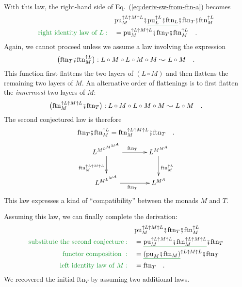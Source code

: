 With this law, the right-hand side of Eq.~(\ref{eq:deriv-sw-from-ftn-a})
becomes
\begin{align*}
 & \text{pu}_{M}^{\uparrow L\uparrow M\uparrow L}\bef\gunderline{\text{pu}_{L}^{\uparrow L}\bef\text{ftn}_{L}}\bef\text{ftn}_{T}\bef\text{ftn}_{M}^{\uparrow L}\\
{\color{greenunder}\text{right identity law of }L:}\quad & =\text{pu}_{M}^{\uparrow L\uparrow M\uparrow L}\bef\text{ftn}_{T}\bef\text{ftn}_{M}^{\uparrow L}\quad.
\end{align*}
Again, we cannot proceed unless we assume a law involving the expression
\[
\big(\text{ftn}_{T}\bef\text{ftn}_{M}^{\uparrow L}\big):L\circ M\circ L\circ M\circ M\leadsto L\circ M\quad.
\]
This function first flattens the two layers of $\left(L\circ M\right)$
and then flattens the remaining two layers of $M$. An alternative
order of flattenings is to first flatten the \emph{innermost} two
layers of $M$:
\[
\big(\text{ftn}_{M}^{\uparrow L\uparrow M\uparrow L}\bef\text{ftn}_{T}\big):L\circ M\circ L\circ M\circ M\leadsto L\circ M\quad.
\]
The second conjectured law is therefore
\[
\text{ftn}_{T}\bef\text{ftn}_{M}^{\uparrow L}=\text{ftn}_{M}^{\uparrow L\uparrow M\uparrow L}\bef\text{ftn}_{T}\quad.
\]
\[
\xymatrix{\xyScaleY{2pc}\xyScaleX{3pc}L^{M^{L^{M^{M^{A}}}}}\ar[r]\sp(0.5){\text{ftn}_{T}}\ar[d]\sb(0.5){\text{ftn}_{M}^{\uparrow L\uparrow M\uparrow L}} & L^{M^{M^{A}}}\ar[d]\sp(0.5){\text{ftn}_{M}^{\uparrow L}}\\
L^{M^{L^{M^{A}}}}\ar[r]\sb(0.5){\text{ftn}_{T}} & L^{M^{A}}
}
\]
This law expresses a kind of ``compatibility'' between the monads
$M$ and $T$.

Assuming this law, we can finally complete the derivation:
\begin{align*}
 & \text{pu}_{M}^{\uparrow L\uparrow M\uparrow L}\bef\text{ftn}_{T}\bef\text{ftn}_{M}^{\uparrow L}\\
{\color{greenunder}\text{substitute the second conjecture}:}\quad & =\gunderline{\text{pu}_{M}^{\uparrow L\uparrow M\uparrow L}\bef\text{ftn}_{M}^{\uparrow L\uparrow M\uparrow L}}\bef\text{ftn}_{T}\\
{\color{greenunder}\text{functor composition }:}\quad & =\gunderline{\left(\text{pu}_{M}\bef\text{ftn}_{M}\right)}^{\uparrow L\uparrow M\uparrow L}\bef\text{ftn}_{T}\\
{\color{greenunder}\text{left identity law of }M:}\quad & =\text{ftn}_{T}\quad.
\end{align*}
We recovered the initial $\text{ftn}_{T}$ by assuming two additional
laws.

